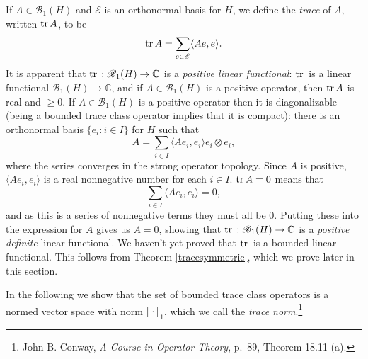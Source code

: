 \documentclass{article}
\newcommand{\inner}[2]{\langle #1, #2 \rangle}
\newcommand{\tr}{\ensuremath\mathrm{tr}\,}
\newcommand{\norm}[1]{\Vert #1 \Vert}
\begin{document}
If $A \in \mathscr{B}_1(H)$ and $\mathscr{E}$ is an orthonormal basis for $H$, we define the {\em trace} of $A$, written $\tr A$, to be
\[
\tr A = \sum_{e \in \mathscr{E}} \inner{Ae}{e}.
\]
It is apparent that $\tr:\mathscr{B}_1(H) \to \mathbb{C}$ is a  {\em positive linear functional}: $\tr$ is a  linear functional $\mathscr{B}_1(H) \to \mathbb{C}$, and if $A \in \mathscr{B}_1(H)$ is a positive operator, then
$\tr A$ is real and $\geq 0$. If $A \in \mathscr{B}_1(H)$ is a positive operator then it is diagonalizable (being a bounded trace class operator implies that it is compact): there is an orthonormal
basis $\{e_i: i \in I\}$ for $H$ such that
\[
A=\sum_{i \in I} \inner{Ae_i}{e_i} e_i \otimes e_i,
\] 
where the series converges in the strong operator topology. 
Since $A$ is positive, $\inner{Ae_i}{e_i}$ is a real nonnegative number for each $i \in I$. $\tr A=0$ means that
\[
\sum_{i \in I} \inner{Ae_i}{e_i}=0,
\]
and as this is a series of nonnegative terms they must all be $0$. Putting these into the expression for $A$ gives us $A=0$, showing that
$\tr:\mathscr{B}_1(H) \to \mathbb{C}$ is a {\em positive definite} linear functional. We haven't yet proved that $\tr$ is a bounded linear functional. This follows
from Theorem \ref{tracesymmetric}, which we prove later in this section.




In the following we show that the set of bounded trace class operators is a normed vector space with norm $\norm{\cdot}_1$,
which we call the {\em trace norm}.\footnote{John
B. Conway, {\em A Course in Operator Theory}, p.~89, Theorem 18.11 (a).}
\end{document}
